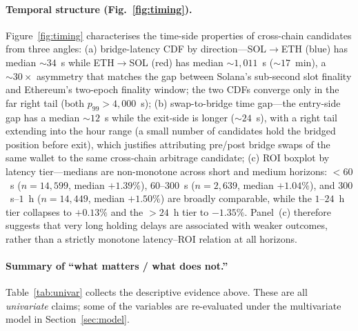 \documentclass[sigconf,nonacm,10pt]{acmart}
\begin{document}
\paragraph{Temporal structure (Fig.~\ref{fig:timing}).}
Figure~\ref{fig:timing} characterises the time-side properties of
cross-chain candidates from three angles:
(a) bridge-latency CDF by direction---SOL$\to$ETH (blue) has
median $\sim\!34$~s while ETH$\to$SOL (red) has median
$\sim\!1{,}011$~s ($\sim\!17$~min), a $\sim\!30\times$ asymmetry
that matches the gap between Solana's sub-second slot finality and
Ethereum's two-epoch finality window; the two CDFs converge only in
the far right tail (both $p_{99}\!>\!4{,}000$~s);
(b) swap-to-bridge time gap---the entry-side gap has a median
$\sim\!12$~s while the exit-side is longer ($\sim\!24$~s), with a
right tail extending into the hour range (a small number of
candidates hold the bridged position before exit), which justifies
attributing pre/post bridge swaps of the same wallet to the same
cross-chain arbitrage candidate;
(c) ROI boxplot by latency tier---medians are non-monotone across
short and medium horizons: $<\!60$~s ($n=14{,}599$, median
$+1.39\%$), $60$--$300$~s ($n=2{,}639$, median $+1.04\%$), and
$300$~s--$1$~h ($n=14{,}449$, median $+1.50\%$) are broadly
comparable, while the $1$--$24$~h tier collapses to $+0.13\%$ and
the $>\!24$~h tier to $-1.35\%$. Panel~(c) therefore suggests that
very long holding delays are associated with weaker outcomes, rather
than a strictly monotone latency--ROI relation at all horizons.

\paragraph{Summary of ``what matters / what does not.''}
Table~\ref{tab:univar} collects the descriptive evidence above. These
are all \emph{univariate} claims; some of the variables are
re-evaluated under the multivariate model in
Section~\ref{sec:model}.
\end{document}
